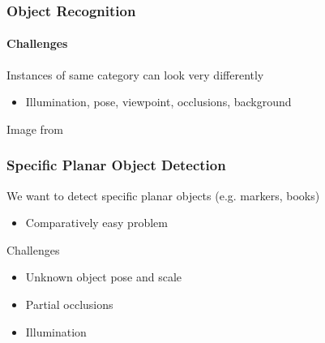 \documentclass[xetex,professionalfont]{beamer}
\begin{document}

\begin{frame}
\frametitle{Object Recognition}
\framesubtitle{Challenges}

Instances of same category can look very differently
\begin{itemize}
    \item Illumination, pose, viewpoint, occlusions, background
\end{itemize}

\medskip
\begin{center}
    {\centering Image from \cite{grauman2011}}
\end{center}

\end{frame}


{
\begin{frame}


\end{frame}
}


\begin{frame}
\frametitle{Specific Planar Object Detection}

We want to detect specific planar objects (e.g. markers, books)
\begin{itemize}
	\item Comparatively easy problem
\end{itemize}

\bigskip
Challenges
\begin{itemize}
	\item Unknown object pose and scale
	\item Partial occlusions
	\item Illumination
\end{itemize}

\end{frame}
\end{document}
